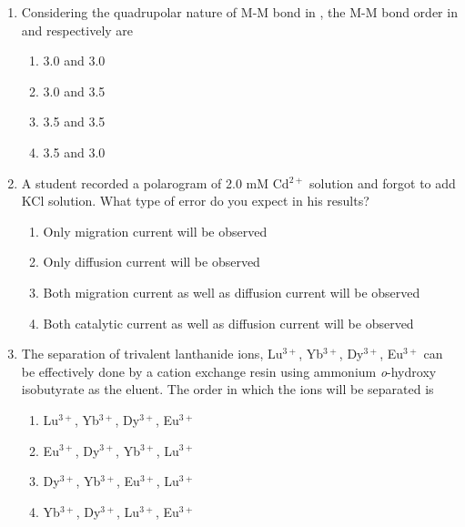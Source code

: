 \documentclass[journal,12pt,onecolumn]{IEEEtran}
\theoremstyle{remark}
\begin{document}
\begin{enumerate}
\item Considering the quadrupolar nature of M-M bond in , the M-M bond order in \ch{[Re2Cl4(PMe2Ph)4]^{+}} and \ch{[Re2Cl4(PMe2Ph)4]} respectively are \hfill{}
\begin{multicols}{2}
\begin{enumerate}[leftmargin=*,labelsep=1em]
     \item   3.0 and 3.0
     \item   3.0 and 3.5
     \item   3.5 and 3.5
     \item   3.5 and 3.0
\end{enumerate}
\end{multicols}
  

\item A student recorded a polarogram of 2.0 mM Cd$^{2+}$ solution and forgot to add KCl solution. What type of error do you expect in his results? \hfill{}
\begin{multicols}{2}
\begin{enumerate}[leftmargin=*,labelsep=1em]
     \item   Only migration current will be observed
     \item   Only diffusion current will be observed
     \item   Both migration current as well as diffusion current will be observed
     \item   Both catalytic current as well as diffusion current will be observed
\end{enumerate}
\end{multicols}
  

\item The separation of trivalent lanthanide ions, Lu$^{3+}$, Yb$^{3+}$, Dy$^{3+}$, Eu$^{3+}$ can be effectively done by a cation exchange resin using ammonium \textit{o}-hydroxy isobutyrate as the eluent. The order in which the ions will be separated is \hfill{}
\begin{multicols}{2}
\begin{enumerate}[leftmargin=*,labelsep=1em]
     \item   Lu$^{3+}$, Yb$^{3+}$, Dy$^{3+}$, Eu$^{3+}$
     \item   Eu$^{3+}$, Dy$^{3+}$, Yb$^{3+}$, Lu$^{3+}$
     \item   Dy$^{3+}$, Yb$^{3+}$, Eu$^{3+}$, Lu$^{3+}$
     \item   Yb$^{3+}$, Dy$^{3+}$, Lu$^{3+}$, Eu$^{3+}$
\end{enumerate}
\end{multicols}
  


\end{enumerate}
\end{document}
